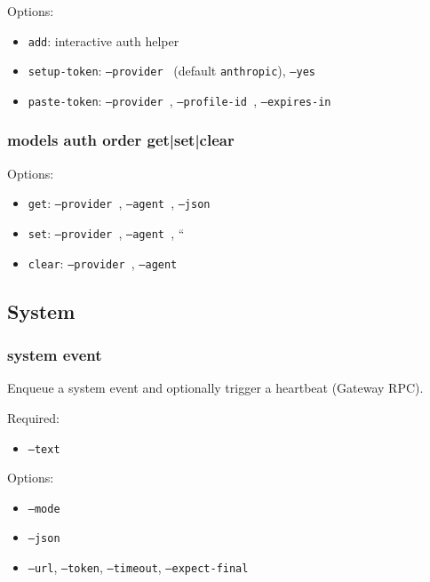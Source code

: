 Options:

\begin{itemize}
  \item \texttt{add}: interactive auth helper
  \item \texttt{setup-token}: \texttt{--provider } (default \texttt{anthropic}), \texttt{--yes}
  \item \texttt{paste-token}: \texttt{--provider }, \texttt{--profile-id }, \texttt{--expires-in }
\end{itemize}


\subsubsection{models auth order get|set|clear}


Options:

\begin{itemize}
  \item \texttt{get}: \texttt{--provider }, \texttt{--agent }, \texttt{--json}
  \item \texttt{set}: \texttt{--provider }, \texttt{--agent }, ``
  \item \texttt{clear}: \texttt{--provider }, \texttt{--agent }
\end{itemize}


\subsection{System}


\subsubsection{system event}


Enqueue a system event and optionally trigger a heartbeat (Gateway RPC).

Required:

\begin{itemize}
  \item \texttt{--text }
\end{itemize}


Options:

\begin{itemize}
  \item \texttt{--mode }
  \item \texttt{--json}
  \item \texttt{--url}, \texttt{--token}, \texttt{--timeout}, \texttt{--expect-final}
\end{itemize}


